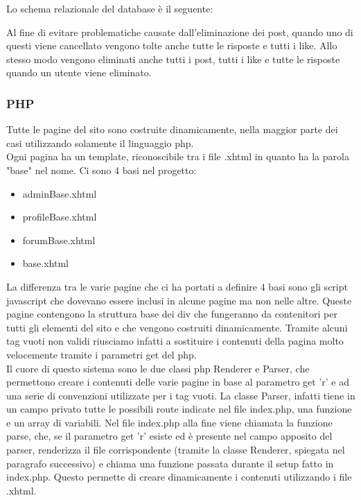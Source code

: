 Lo schema relazionale del database è il seguente: 


Al fine di evitare problematiche causate dall'eliminazione dei post, quando uno di questi viene cancellato vengono tolte anche tutte le risposte e tutti i like. Allo stesso modo vengono eliminati anche tutti i post, tutti i like e tutte le risposte
quando un utente viene eliminato.

\subsubsection{PHP}\label{subs:php}

Tutte le pagine del sito sono costruite dinamicamente, nella maggior parte dei casi utilizzando solamente il linguaggio php.\\
Ogni pagina ha un template, riconoscibile tra i file .xhtml in quanto ha la parola "base" nel nome. Ci sono 4 basi nel progetto:

\begin{itemize}
    
	\item adminBase.xhtml
    \item profileBase.xhtml
	\item forumBase.xhtml
	\item base.xhtml
	
\end{itemize}

La differenza tra le varie pagine che ci ha portati a definire 4 basi sono gli script javascript che dovevano essere inclusi in alcune pagine ma non nelle altre. Queste pagine contengono la struttura base dei div che fungeranno 
da contenitori per tutti gli elementi del sito e che vengono costruiti dinamicamente. Tramite alcuni tag vuoti non validi riusciamo infatti a sostituire i contenuti della pagina molto velocemente tramite i parametri get del php.\\

Il cuore di questo sistema sono le due classi php Renderer e Parser, che permettono creare i contenuti delle varie pagine in base al parametro get 'r' e ad una serie di convenzioni utilizzate per i tag vuoti. La classe Parser, infatti
tiene in un campo privato tutte le possibili route indicate nel file index.php, una funzione e un array di variabili. Nel file index.php alla fine viene chiamata la funzione parse, che, se il parametro get 'r' esiste ed è presente nel campo apposito del parser, 
renderizza il file corrispondente (tramite la classe Renderer, spiegata nel paragrafo successivo) e chiama una funzione passata durante il setup fatto in index.php. Questo permette di creare dinamicamente i contenuti utilizzando i file .xhtml.

